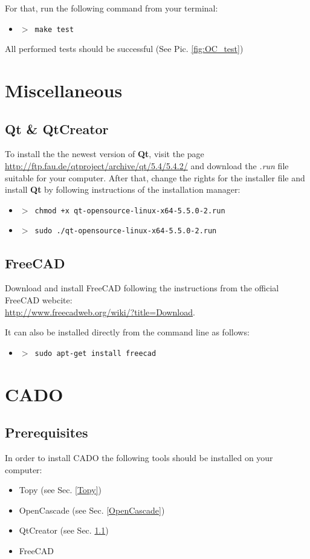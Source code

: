 \documentclass[
12pt, %
a4paper, %
oneside, %
headinclude,footinclude, %
BCOR5mm, %
]{scrartcl}
\begin{document}
For that, run the following command from your terminal:
\begin{itemize}
\item[] \texttt{\textbf{$>$ }make test}
\end{itemize}
All performed tests should be successful (See Pic. \ref{fig:OC_test})

\section{Miscellaneous}
\subsection{Qt \& QtCreator}
\label{Qt}
To install the the newest version of \textbf{Qt}, visit the page \\ \href{http://ftp.fau.de/qtproject/archive/qt/5.4/5.4.2/}{http://ftp.fau.de/qtproject/archive/qt/5.4/5.4.2/} and download the \textit{.run} file suitable for your computer. 
After that, change the rights for the installer file and install \textbf{Qt} by following instructions of the installation manager:
\begin{itemize}
\item[] \texttt{\textbf{$>$ }chmod +x qt-opensource-linux-x64-5.5.0-2.run}
\item[] \texttt{\textbf{$>$ }sudo ./qt-opensource-linux-x64-5.5.0-2.run}
\end{itemize}
\subsection{FreeCAD}
Download and install FreeCAD following the instructions from the official FreeCAD webcite: \\ \href{http://www.freecadweb.org/wiki/?title=Download}{http://www.freecadweb.org/wiki/?title=Download}.

It can also be installed directly from the command line as follows:
\begin{itemize}
\item[] \texttt{\textbf{$>$ }sudo apt-get install freecad}
\end{itemize}

\section{CADO}
\subsection{Prerequisites}
In order to install CADO the following tools should be installed on your computer:
\begin{itemize}
	\item Topy (see Sec. \ref{Topy})
	\item OpenCascade (see Sec. \ref{OpenCascade})
	\item QtCreator (see Sec. \ref{Qt})
	\item FreeCAD
	\end{itemize}
\end{document}
